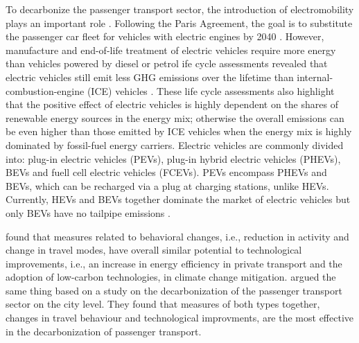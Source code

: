 \documentclass[journal,article,submit,pdftex,moreauthors]{Definitions/mdpi}
\begin{document}
    To decarbonize the passenger transport sector, the introduction of electromobility plays an important role \citep{HEIDRICH201717, Das2020}. Following the Paris Agreement, the goal is to substitute the passenger car fleet for vehicles with electric engines by 2040 \cite{Nachhaltig}. However, manufacture and end-of-life treatment of electric vehicles require more energy than vehicles powered by diesel or petrol\added{;} ife cycle assessments revealed that electric vehicles still emit less GHG emissions over the lifetime than internal-combustion-engine (ICE) vehicles \citep{VanVliet2011, Bauer2015}. These life cycle assessments also highlight that the positive effect of electric vehicles is highly dependent on the shares of renewable energy sources in the energy mix; otherwise the overall emissions can be even higher than those emitted by ICE vehicles when the energy mix is highly dominated by fossil-fuel energy carriers. Electric vehicles are commonly divided into: plug-in electric vehicles (PEVs), plug-in hybrid electric vehicles (PHEVs), BEVs and fuell cell electric vehicles (FCEVs). PEVs encompass PHEVs and BEVs, which can be recharged via a plug at charging stations, unlike HEVs. Currently, HEVs and BEVs together dominate the market of electric vehicles but only BEVs have no tailpipe emissions \citep{VanVliet2011, Ajanovic2015}. 
    
    \citet{Costa2021} found that measures related to behavioral changes, i.e., reduction in activity and change in travel modes, have overall similar potential to technological improvements, i.e., an increase in energy efficiency in private transport and the adoption of low-carbon technologies, in climate change mitigation. \citet{DILLMAN2021102614} argued the same thing based on a study on the decarbonization of the passenger transport sector on the city level. They found that measures of both types together, changes in travel behaviour and technological improvments, are the most effective in the decarbonization of passenger transport.
    
    
    
    
    

    
    
\end{document}

